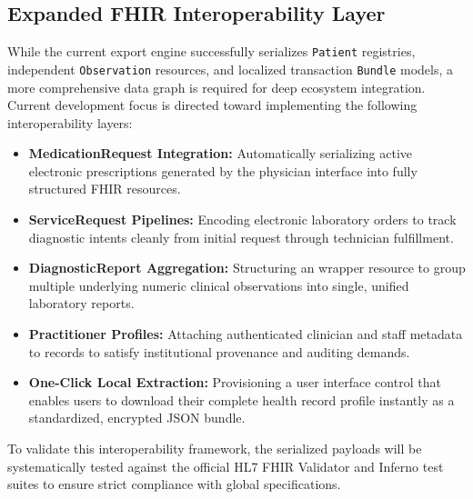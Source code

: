 \documentclass[12pt, a4paper]{report}
\numberwithin{equation}{chapter}
\begin{document}
\subsection{Expanded FHIR Interoperability Layer}
While the current export engine successfully serializes \texttt{Patient} registries, independent \texttt{Observation} resources, and localized transaction \texttt{Bundle} models, a more comprehensive data graph is required for deep ecosystem integration. Current development focus is directed toward implementing the following interoperability layers:
\begin{itemize}
    \item \textbf{MedicationRequest Integration:} Automatically serializing active electronic prescriptions generated by the physician interface into fully structured FHIR resources.
    \item \textbf{ServiceRequest Pipelines:} Encoding electronic laboratory orders to track diagnostic intents cleanly from initial request through technician fulfillment.
    \item \textbf{DiagnosticReport Aggregation:} Structuring an wrapper resource to group multiple underlying numeric clinical observations into single, unified laboratory reports.
    \item \textbf{Practitioner Profiles:} Attaching authenticated clinician and staff metadata to records to satisfy institutional provenance and auditing demands.
    \item \textbf{One-Click Local Extraction:} Provisioning a user interface control that enables users to download their complete health record profile instantly as a standardized, encrypted JSON bundle.
\end{itemize}
To validate this interoperability framework, the serialized payloads will be systematically tested against the official HL7 FHIR Validator and Inferno test suites to ensure strict compliance with global specifications.
\end{document}
